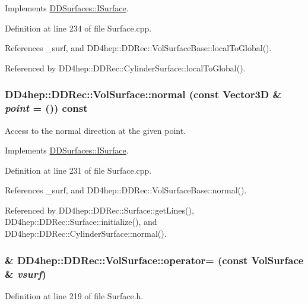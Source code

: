 Implements \hyperlink{class_d_d_surfaces_1_1_i_surface_a39651d79f7969ac7402a6e2cfc37803c}{DDSurfaces::ISurface}.

Definition at line 234 of file Surface.cpp.

References \_\-surf, and DD4hep::DDRec::VolSurfaceBase::localToGlobal().

Referenced by DD4hep::DDRec::CylinderSurface::localToGlobal().\hypertarget{class_d_d4hep_1_1_d_d_rec_1_1_vol_surface_a2c5a55647d8f69637f4fc8d88bc70b67}{
\subsubsection[{normal}]{ DD4hep::DDRec::VolSurface::normal (const {\bf Vector3D} \& {\em point} = {()}) const}}
\label{class_d_d4hep_1_1_d_d_rec_1_1_vol_surface_a2c5a55647d8f69637f4fc8d88bc70b67}


Access to the normal direction at the given point. 

Implements \hyperlink{class_d_d_surfaces_1_1_i_surface_abbead4b1af2864d6d3f61270543310a0}{DDSurfaces::ISurface}.

Definition at line 231 of file Surface.cpp.

References \_\-surf, and DD4hep::DDRec::VolSurfaceBase::normal().

Referenced by DD4hep::DDRec::Surface::getLines(), DD4hep::DDRec::Surface::initialize(), and DD4hep::DDRec::CylinderSurface::normal().\hypertarget{class_d_d4hep_1_1_d_d_rec_1_1_vol_surface_a3572914428d729854bc7c55466ddb788}{
\subsubsection[{operator=}]{\& DD4hep::DDRec::VolSurface::operator= (const {\bf VolSurface} \& {\em vsurf})}}
\label{class_d_d4hep_1_1_d_d_rec_1_1_vol_surface_a3572914428d729854bc7c55466ddb788}


Definition at line 219 of file Surface.h.

